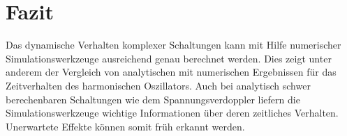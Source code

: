 \chapter{Fazit}\label{sec:fazit}
Das dynamische Verhalten komplexer Schaltungen kann mit Hilfe numerischer Simulationswerkzeuge ausreichend genau berechnet werden. Dies zeigt unter anderem der Vergleich von analytischen mit numerischen Ergebnissen für das Zeitverhalten des harmonischen Oszillators. Auch bei analytisch schwer berechenbaren Schaltungen wie dem Spannungsverdoppler liefern die Simulationswerkzeuge wichtige Informationen über deren zeitliches Verhalten. Unerwartete Effekte können somit früh erkannt werden.